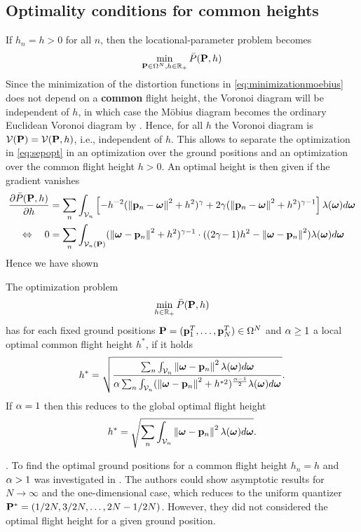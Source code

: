 \documentclass[smallabstract,smallcaptions]{dccpaper}
\newenvironment{remark}{\par\vspace{1.5ex}\noindent{\em Remark\/}.}{\par\vspace{1.5ex}}
\newcommand{\df}{\ensuremath{\lam}}         %
\newcommand{\Pbar}{\ensuremath{\bar{P}}}         %
\newcommand{\Vor}{\ensuremath{\mathcal{V}}}         %
\begin{document}
\subsection{Optimality conditions for common heights}

If $h_n=h>0$ for all $n$, then the locational-parameter problem becomes
%
\begin{align}
  \min_{\vP\in\Omega^N,h\in\R_+} \Pbar(\vP,h) \label{eq:sepopt}
\end{align}
% 
Since the minimization of the distortion functions in \eqref{eq:minimizationmoebius}   does not depend on a {\bfseries
common} flight
height, the Voronoi diagram will be independent of $h$, in which case the Möbius diagram becomes the ordinary Euclidean
Voronoi diagram by .
%
Hence, for all $h$ the Voronoi diagram is $\Vor(\vP)=\Vor(\vP,h)$, i.e., independent of $h$. This allows to separate the
optimization in \eqref{eq:sepopt} in an optimization over the ground positions and an optimization over the common
flight height $h>0$. An optimal height is then given if the gradient vanishes
%
\begin{align}
  \frac{\partial \Pbar(\vP,h)}{\partial h} &= \sum_n{\int_{\Vor_n} \left[-h^{-2}(\Norm{\vp_n-\vome}^2 + h^2)^{\gam} + 2\gam 
    (\Norm{\vp_n-\vome}^2 +h^2)^{\gam-1}\right]
    \df(\vome)d \vome} \notag\\
  \LRA\quad 0 &= \sum_n\int_{\Vor_n(\vP)} (\Norm{\vome-\vp_n}^2+h^2)^{\gam-1} \cdot ((2\gam\!-1)h^2 -\Norm{\vome-\vp_n}^2)
  \df(\vome)d \vome
\end{align}
%
Hence we have shown
%
\begin{corollary}
  The optimization problem 
  \begin{align}
    \min_{h\in\R_+} \Pbar(\vP,h)
  \end{align}
  has for each fixed ground positions $\mathbf P =({\mathbf p}_1^T,\dots,{\mathbf p}_N^T)\in\Omega^N$ and $\alpha\geq 1$ a
  local optimal common flight height $h^*$, if it holds
  \begin{align}
     h^* = \sqrt{\frac{ \sum_n \int_{\Vor_n} \Norm{\vome-\vp_n}^2 \df(\vome)d\vome}{\alp\sum_n \int_{\Vor_n}
     (\Norm{\vome-\vp_n}^2+h^{*2})^{\frac{\alp-1}{2}} \df(\vome)d\vome}}.
   \end{align}
   If $\alpha=1$ then this reduces to the global optimal flight height 
   \begin{align}
      h^{*} =  \sqrt{\sum_n \int_{\Vor_n} \Norm{\vome-\vp_n}^2 \df(\vome)d\vome}.
   \end{align}
\end{corollary}
%
\begin{remark}
  To find the optimal ground positions for a common flight height $h_n=h$ and $\alpha>1$ was investigated in \cite[Sec.III]{KSS18}.
  The authors could show asymptotic results for $N\to\infty$ and the one-dimensional case, which reduces to the uniform
  quantizer $\mathbf P ^*=(1/2N,3/2N,\dots,2N-1/2N)$. However, they did not considered the optimal flight height for a given ground
  position.
\end{remark}
 
\end{document}
